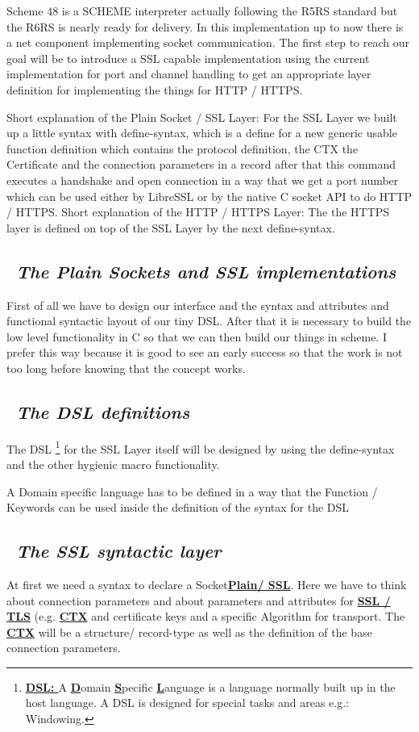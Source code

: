 \documentclass[10pt,a4paper,english]{article}
\newcommand{\rubric}[1]{\subsection*{~\hfill {\it #1} \hfill ~}}
\begin{document}
\begin{flushleft}
Scheme 48 is a SCHEME interpreter actually following the R5RS standard but the R6RS is nearly ready for delivery. In this implementation up to now there is a net component implementing socket communication.
The first step to reach our goal will be to introduce a SSL capable implementation using the current implementation for port and channel handling to get an appropriate layer definition for  implementing the things for HTTP / HTTPS.
\end{flushleft}
\begin{flushleft}
Short explanation of the Plain Socket / SSL Layer:
For the SSL Layer we built up a little syntax with define-syntax,  which is a define for a new generic usable function definition which contains the protocol definition, the CTX the Certificate and the connection parameters in a record after that this command executes a handshake and  open connection in a way that we  get a port number which can be used either by LibreSSL or by the native C socket API to do HTTP / HTTPS.
Short explanation of the HTTP / HTTPS Layer:
The the HTTPS layer  is defined on top of the SSL Layer by the  next define-syntax.
\end{flushleft}

\rubric{The Plain Sockets and SSL implementations }
\begin{flushleft}
First of all we have to design our interface and the syntax and attributes and functional syntactic layout of our tiny DSL. After that it is necessary to build the low level functionality in C so that we can then build our things in scheme. I prefer this way because it is good to see an early success so that the work is not too long before knowing that the concept works. 
\end{flushleft}

\rubric{The DSL definitions}
\begin{flushleft}
The DSL \footnote{\textbf{\underline {DSL: }} A \textbf{\underline {D}}omain \textbf{\underline {S}}pecific \textbf{\underline {L}}anguage is a language normally built up in the host language. A DSL is designed for special tasks and areas e.g.: Windowing.} for the SSL Layer itself will be designed by using the define-syntax and the other hygienic macro functionality.\end{flushleft}
A Domain specific language has to be defined in a way that the Function / Keywords can be used inside the definition of the syntax for the DSL

\rubric{The SSL syntactic layer}
\begin{flushleft}
 At first we need a syntax to declare a Socket\textbf{\underline {Plain/ SSL}}. Here we have to think about connection parameters and about parameters and attributes for \textbf{\underline {SSL / TLS}} (e.g. \textbf{\underline {CTX}} and certificate keys and a specific Algorithm for transport. 
The \textbf{\underline {CTX}} will be a structure/ record-type as well as the definition of the base connection parameters. 
\end{flushleft}
\end{document}
